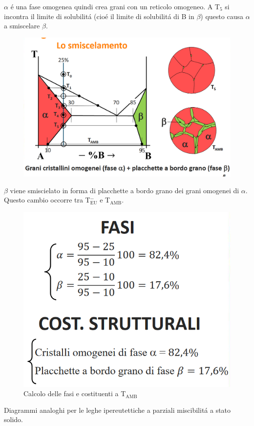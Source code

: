 \documentclass{article}
\begin{document}
{\begin{figure}[h!]
            \end{figure}
            $\alpha$ \'e una fase omogenea quindi crea grani con un reticolo omogeneo. A T$_5$ si incontra il limite di solubilit\'a (cio\'e il limite di solubilit\'a di B in $\beta$) questo causa $\alpha$ a smiscelare $\beta$.\\
            \begin{figure}[h!]
                \centering
                \includegraphics[width=.85\linewidth]{Diagramma di stato di parziale solubilita per lega ipoeutettica e smiscielamento tra T5 e TAMB.png}
            \end{figure}
            $\beta$ viene smiscielato in forma di placchette a bordo grano dei grani omogenei di $\alpha$. Questo cambio occorre tra T$^-_\text{EU}$ e T$_\text{AMB}$.\\
            \begin{figure}[h!]
                \centering
                \includegraphics[width=.65\linewidth]{Calcoli per Fasi e Costituenti nella lega ipoeutettica per metalli parzialmente miscibili a TAMB.png}
                \caption{Calcolo delle fasi e costituenti a T$_\text{AMB}$}
            \end{figure}
            Diagrammi analoghi per le leghe ipereutettiche a parziali miscibilit\'a a stato solido.\\
}
\end{document}
